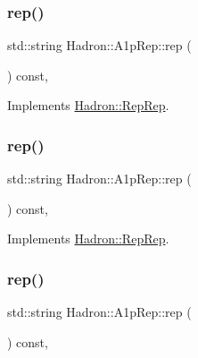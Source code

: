 \subsubsection{\texorpdfstring{rep()}{rep()}\hspace{0.1cm}{\footnotesize\ttfamily [1/3]}}
{\footnotesize\ttfamily std\+::string Hadron\+::\+A1p\+Rep\+::rep (\begin{DoxyParamCaption}{ }\end{DoxyParamCaption}) const\hspace{0.3cm}{\ttfamily [inline]}, {\ttfamily [virtual]}}



Implements \mbox{\hyperlink{structHadron_1_1RepRep_ab3213025f6de249f7095892109575fde}{Hadron\+::\+Rep\+Rep}}.

\mbox{\label{structHadron_1_1A1pRep_a675f4c667a7e5d059a65b5ddad0321f3}} 
\subsubsection{\texorpdfstring{rep()}{rep()}\hspace{0.1cm}{\footnotesize\ttfamily [2/3]}}
{\footnotesize\ttfamily std\+::string Hadron\+::\+A1p\+Rep\+::rep (\begin{DoxyParamCaption}{ }\end{DoxyParamCaption}) const\hspace{0.3cm}{\ttfamily [inline]}, {\ttfamily [virtual]}}



Implements \mbox{\hyperlink{structHadron_1_1RepRep_ab3213025f6de249f7095892109575fde}{Hadron\+::\+Rep\+Rep}}.

\mbox{\label{structHadron_1_1A1pRep_a675f4c667a7e5d059a65b5ddad0321f3}} 
\subsubsection{\texorpdfstring{rep()}{rep()}\hspace{0.1cm}{\footnotesize\ttfamily [3/3]}}
{\footnotesize\ttfamily std\+::string Hadron\+::\+A1p\+Rep\+::rep (\begin{DoxyParamCaption}{ }\end{DoxyParamCaption}) const\hspace{0.3cm}{\ttfamily [inline]}, {\ttfamily [virtual]}}



